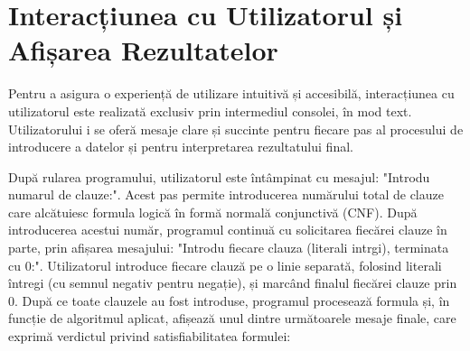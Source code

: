 \documentclass[12pt,a4paper]{article}
\begin{document}
\section{Interacțiunea cu Utilizatorul și Afișarea Rezultatelor}

Pentru a asigura o experiență de utilizare intuitivă și accesibilă, interacțiunea cu utilizatorul este realizată exclusiv prin intermediul consolei, în mod text. Utilizatorului i se oferă mesaje clare și succinte pentru fiecare pas al procesului de introducere a datelor și pentru interpretarea rezultatului final.

După rularea programului, utilizatorul este întâmpinat cu mesajul: "Introdu numarul de clauze:". Acest pas permite introducerea numărului total de clauze care alcătuiesc formula logică în formă normală conjunctivă (CNF).
După introducerea acestui număr, programul continuă cu solicitarea fiecărei clauze în parte, prin afișarea mesajului: "Introdu fiecare clauza (literali intrgi), terminata cu 0:". Utilizatorul introduce fiecare clauză pe o linie separată, folosind literali întregi (cu semnul negativ pentru negație), și marcând finalul fiecărei clauze prin 0. După ce toate clauzele au fost introduse, programul procesează formula și, în funcție de algoritmul aplicat, afișează unul dintre următoarele mesaje finale, care exprimă verdictul privind satisfiabilitatea formulei:


\end{document}
